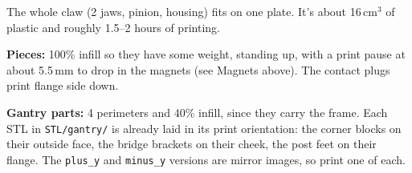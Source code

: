 \documentclass[10pt]{article}
\newcommand{\mm}{\,mm}
\newcommand{\file}[1]{\texttt{#1}}
\begin{document}
The whole claw (2 jaws, pinion, housing) fits on one plate. It's about 16\,cm$^3$ of plastic
and roughly 1.5--2 hours of printing.

\textbf{Pieces:} 100\% infill so they have some weight, standing up, with a print pause at about
5.5\mm{} to drop in the magnets (see Magnets above). The contact plugs print flange side down.

\textbf{Gantry parts:} 4 perimeters and 40\% infill, since they carry the frame. Each STL in
\file{STL/gantry/} is already laid in its print orientation: the corner blocks on their outside face,
the bridge brackets on their cheek, the post feet on their flange. The \file{plus\_y} and
\file{minus\_y} versions are mirror images, so print one of each.
\end{document}
